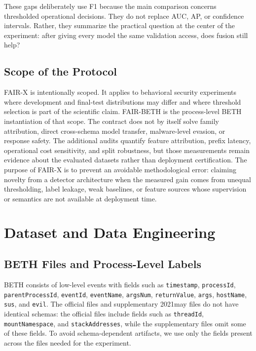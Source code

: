 \documentclass[10pt,journal,compsoc]{IEEEtran}
\begin{document}
These gaps deliberately use F1 because the main comparison concerns thresholded operational decisions. They do not replace AUC, AP, or confidence intervals. Rather, they summarize the practical question at the center of the experiment: after giving every model the same validation access, does fusion still help?

\subsection{Scope of the Protocol}

FAIR-X is intentionally scoped. It applies to behavioral security experiments where development and final-test distributions may differ and where threshold selection is part of the scientific claim. FAIR-BETH is the process-level BETH instantiation of that scope. The contract does not by itself solve family attribution, direct cross-schema model transfer, malware-level evasion, or response safety. The additional audits quantify feature attribution, prefix latency, operational cost sensitivity, and split robustness, but those measurements remain evidence about the evaluated datasets rather than deployment certification. The purpose of FAIR-X is to prevent an avoidable methodological error: claiming novelty from a detector architecture when the measured gain comes from unequal thresholding, label leakage, weak baselines, or feature sources whose supervision or semantics are not available at deployment time.

\section{Dataset and Data Engineering}
\label{sec:data}

\subsection{BETH Files and Process-Level Labels}

BETH consists of low-level events with fields such as \texttt{timestamp}, \texttt{processId}, \texttt{parentProcessId}, \texttt{eventId}, \texttt{eventName}, \texttt{argsNum}, \texttt{returnValue}, \texttt{args}, \texttt{hostName}, \texttt{sus}, and \texttt{evil}. The official files and supplementary 2021may files do not have identical schemas: the official files include fields such as \texttt{threadId}, \texttt{mountNamespace}, and \texttt{stackAddresses}, while the supplementary files omit some of these fields. To avoid schema-dependent artifacts, we use only the fields present across the files needed for the experiment.
\end{document}
